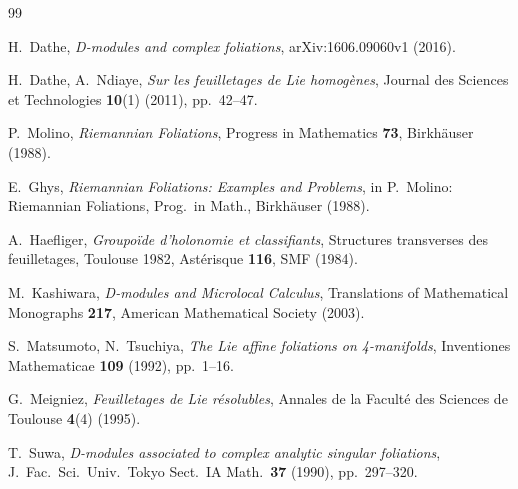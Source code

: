 \documentclass[12pt,a4paper]{article}
\begin{document}
\begin{thebibliography}{99}

H.~Dathe,
\textit{D-modules and complex foliations},
arXiv:1606.09060v1 (2016).

H.~Dathe, A.~Ndiaye,
\textit{Sur les feuilletages de Lie homog\`enes},
Journal des Sciences et Technologies \textbf{10}(1) (2011), pp.~42--47.

P.~Molino,
\textit{Riemannian Foliations},
Progress in Mathematics \textbf{73}, Birkh\"auser (1988).

E.~Ghys,
\textit{Riemannian Foliations: Examples and Problems},
in P.~Molino: Riemannian Foliations,
Prog.\ in Math., Birkh\"auser (1988).

A.~Haefliger,
\textit{Groupo\"ide d'holonomie et classifiants},
Structures transverses des feuilletages, Toulouse 1982,
Ast\'erisque \textbf{116}, SMF (1984).

M.~Kashiwara,
\textit{D-modules and Microlocal Calculus},
Translations of Mathematical Monographs \textbf{217},
American Mathematical Society (2003).

S.~Matsumoto, N.~Tsuchiya,
\textit{The Lie affine foliations on 4-manifolds},
Inventiones Mathematicae \textbf{109} (1992), pp.~1--16.

G.~Meigniez,
\textit{Feuilletages de Lie r\'esolubles},
Annales de la Facult\'e des Sciences de Toulouse
\textbf{4}(4) (1995).

T.~Suwa,
\textit{D-modules associated to complex analytic singular foliations},
J.\ Fac.\ Sci.\ Univ.\ Tokyo Sect.\ IA Math.\
\textbf{37} (1990), pp.~297--320.

\end{thebibliography}
\end{document}
